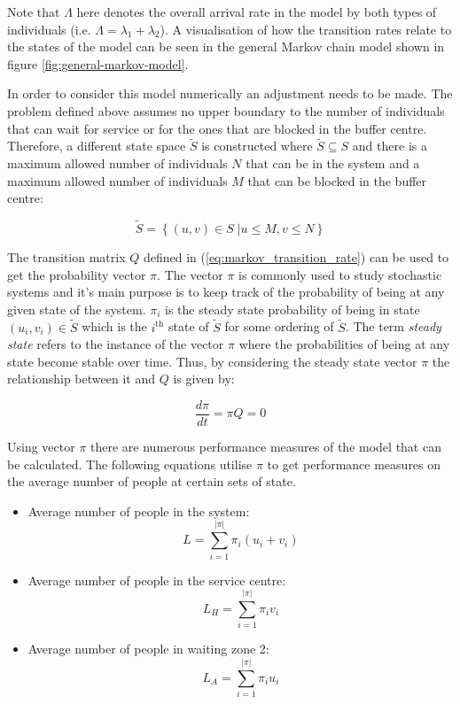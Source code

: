 Note that \(\Lambda\) here denotes the overall arrival rate in the model by both 
types of individuals (i.e. \(\Lambda = \lambda_1 + \lambda_2\)). 
A visualisation of how the transition rates relate to the states of the model 
can be seen in the general Markov chain model shown in figure 
\ref{fig:general-markov-model}.




In order to consider this model numerically an adjustment needs to be made. 
The problem defined above assumes no upper boundary to the number of individuals 
that can wait for service or for the ones that are blocked in the buffer centre. 
Therefore, a different state space \( \tilde S \) is constructed where 
\( \tilde S \subseteq S \) and there is a maximum allowed number of individuals 
\(N\) that can be in the system and a maximum allowed number of individuals 
\(M\) that can be blocked in the buffer centre:

\begin{equation}
    \tilde S = \left\{ (u, v) \in S\;| u \leq M, v\leq N \right\}
\end{equation}


The transition matrix \( Q \) defined in (\ref{eq:markov_transition_rate}) can 
be used to get the probability vector \( \pi \).
The vector \( \pi \) is commonly used to study stochastic systems and it's main
purpose is to keep track of the probability of being at any given state of 
the system. 
\(\pi_i\) is the steady state probability of being in state \((u_i, v_i) \in 
\tilde S\) which is the \(i^{\text{th}}\) state of \(\tilde S\) for some ordering of 
\(\tilde S\).
The term \textit{steady state} refers to the instance of the vector \( \pi \) 
where the probabilities of being at any state become stable over time. 
Thus, by considering the steady state vector \( \pi \) the relationship between 
it and \( Q \) is given by:

\[
    \frac{d\pi}{dt} = \pi Q = 0
\]

Using vector \(\pi\) there are numerous performance measures of the model that 
can be calculated. 
The following equations utilise \(\pi\) to get performance measures on the 
average number of people at certain sets of state.

\begin{itemize}
    \item Average number of people in the system: 
        \[L = \sum_{i=1}^{|\pi|} \pi_i (u_i + v_i)\]
    \item Average number of people in the service centre: 
        \[L_H = \sum_{i=1}^{|\pi|} \pi_i v_i\]
    \item Average number of people in waiting zone 2:
        \[L_A = \sum_{i=1}^{|\pi|} \pi_i u_i\] 
\end{itemize}

